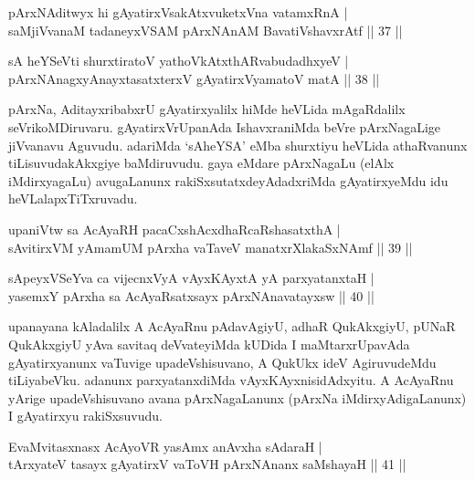 \begin{shl}
pArxNAditwyx hi gAyatirxVsakAtxvuketxVna vatamxRnA | \\
saMjiVvanaM tadaneyxVSAM pArxNAnAM BavatiVshavxrAtf \hfill ||  37 || 
\end{shl}

\begin{shl}
sA heYSeVti shurxtiratoV yathoVkAtxthARvabudadhxyeV  | \\
pArxNAnagxyAnayxtasatxterxV gAyatirxVyamatoV matA \hfill ||  38 || 
\end{shl}

\begin{artha} 
pArxNa, AditayxribabxrU gAyatirxyalilx hiMde heVLida mAgaRdalilx 
seVrikoMDiruvaru. gAyatirxVrUpanAda IshavxraniMda beVre pArxNagaLige 
jiVvanavu Aguvudu. adariMda `sAheYSA' eMba shurxtiyu heVLida 
athaRvanunx tiLisuvudakAkxgiye baMdiruvudu. gaya eMdare pArxNagaLu 
(elAlx iMdirxyagaLu) avugaLanunx rakiSxsutatxdeyAdadxriMda 
gAyatirxyeMdu idu heVLalapxTiTxruvadu.
\end{artha}


\begin{shl}
upaniVtw sa AcAyaRH pacaCxshAcxdhaRcaRshasatxthA | \\
sAvitirxVM yAmamUM pArxha vaTaveV manatxrXlakaSxNAmf \hfill ||  39 ||
\end{shl}

\begin{shl}
sA\s peyxVSeYva ca vijecnxVyA vAyxKAyxtA yA parxyatanxtaH | \\
yasemxY pArxha sa AcAyaRsatxsayx pArxNAnavatayxsw \hfill ||  40 || 
\end{shl}

\begin{artha} 
upanayana kAladalilx A AcAyaRnu pAdavAgiyU, adhaR QukAkxgiyU, pUNaR 
QukAkxgiyU yAva savitaq deVvateyiMda kUDida I maMtarxrUpavAda 
gAyatirxyanunx vaTuvige upadeVshisuvano, A QukUkx ideV AgiruvudeMdu 
tiLiyabeVku. adanunx parxyatanxdiMda vAyxKAyxnisidAdxyitu. A AcAyaRnu 
yArige upadeVshisuvano avana pArxNagaLanunx (pArxNa 
iMdirxyAdigaLanunx) I gAyatirxyu rakiSxsuvudu.
\end{artha}


\begin{shl}
EvaMvitasxnasx AcAyoVR yasAmx anAvxha sAdaraH | \\
tArxyateV tasayx gAyatirxV vaToVH pArxNAnanx saMshayaH \hfill ||  41 || 
\end{shl}

